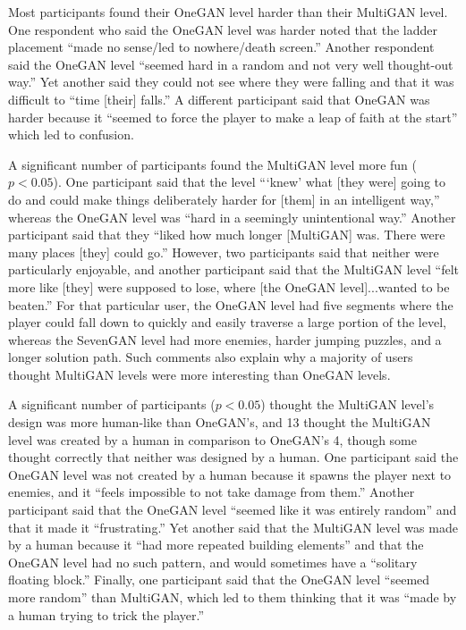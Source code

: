 Most participants found their OneGAN level harder than their MultiGAN level. One respondent who said the OneGAN level was harder noted that the ladder placement ``made no sense/led to nowhere/death screen.'' Another respondent said the OneGAN level ``seemed hard in a random and not very well thought-out way.'' Yet another said they could not see where they were falling and that it was difficult to ``time [their] falls.'' A different participant said that OneGAN was harder because it ``seemed to force the player to make a leap of faith at the start'' which led to confusion.


A significant number of participants found the MultiGAN level more fun ($p < 0.05$). %
One participant said that the level ```knew' what [they were] going to do and could make things deliberately harder for [them] in an intelligent way,'' whereas the OneGAN level was ``hard in a seemingly unintentional way.'' Another participant said that they ``liked how much longer [MultiGAN] was. There were many places [they] could go.'' However, two participants said that neither were particularly enjoyable, and another participant said that the MultiGAN level ``felt more like [they] were supposed to lose, where [the OneGAN level]...wanted to be beaten.'' For that particular user, the OneGAN level had five segments where the player could fall down to quickly and easily traverse a large portion of the level, whereas the SevenGAN level had more enemies, harder jumping puzzles, and a longer solution path. Such comments also explain why a majority of users thought MultiGAN levels were more interesting than OneGAN levels.



A significant number of participants ($p < 0.05$) thought the MultiGAN level's design was more human-like than OneGAN's, and 13 thought the MultiGAN level was created by a human in comparison to OneGAN's 4, though some thought correctly that neither was designed by a human.
One participant said the OneGAN level was not created by a human because it spawns the player next to enemies, and it ``feels impossible to not take damage from them.'' Another participant said that the OneGAN level ``seemed like it was entirely random'' and that it made it ``frustrating.'' Yet another said that the MultiGAN level was made by a human because it ``had more repeated building elements'' and that the OneGAN level had no such pattern, and would sometimes have a ``solitary floating block.'' Finally, one participant said that the OneGAN level ``seemed more random'' than MultiGAN, which led to them thinking that it was ``made by a human trying to trick the player.''


